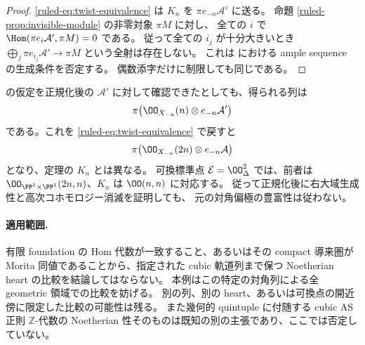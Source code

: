\begin{proof}
\eqref{ruled-eq:twist-equivalence} は $K_n$ を $\pi e_{-n}\mathcal A'$ に送る。
命題 \ref{ruled-prop:invisible-module} の非零対象 $\pi M$ に対し、
全ての $i$ で $\Hom(\pi e_i\mathcal A',\pi M)=0$ である。
従って全ての $i_j$ が十分大きいとき
$\bigoplus_j\pi e_{i_j}\mathcal A'\to\pi M$ という全射は存在しない。
これは \cite[\S8.1 の (A1)]{VanDenBergh2012P1} における ample sequence の生成条件を否定する。
偶数添字だけに制限しても同じである。
\end{proof}

\begin{remark}[正規化後の強豊富性との両立]
\cite[Lemma 8.1.1]{VanDenBergh2012P1} の仮定を正規化後の $\mathcal A'$ に対して確認できたとしても、得られる列は
\[
 \pi\bigl(\OO_{X_{-n}}(n)\otimes e_{-n}\mathcal A'\bigr)
\]
である。これを \eqref{ruled-eq:twist-equivalence} で戻すと
\[
 \pi\bigl(\OO_{X_{-n}}(2n)\otimes e_{-n}\mathcal A\bigr)
\]
となり、定理の $K_n$ とは異なる。
可換標準点 $\mathcal E=\OO_\Delta^2$ では、前者は
$\OO_{\PP^1\times\PP^1}(2n,n)$、$K_n$ は $\OO(n,n)$ に対応する。
従って正規化後に右大域生成性と高次コホモロジー消滅を証明しても、
元の対角偏極の豊富性は従わない。
\end{remark}

\paragraph{適用範囲.}
有限 foundation の Hom 代数が一致すること、あるいはその compact 導来圏が
Morita 同値であることから、指定された cubic 軌道列まで保つ
Noetherian heart の比較を結論してはならない。
本例はこの特定の対角列による全 geometric 領域での比較を妨げる。
別の列、別の heart、あるいは可換点の開近傍に限定した比較の可能性は残る。
また幾何的 quintuple に付随する cubic AS 正則 $\mathbb Z$-代数の
Noetherian 性そのものは既知の別の主張であり、ここでは否定していない。

